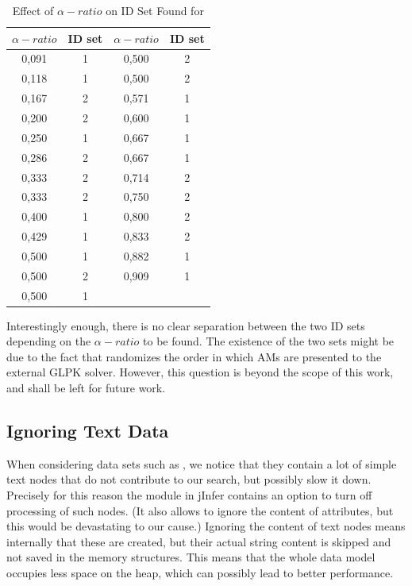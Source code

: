 \begin{table}
  \caption{Effect of $\alpha-ratio$ on ID Set Found for }
  \bigskip
  \label{table-experiments-various-betas-ova1-ratio-effect}
  \centering
  \begin{tabular}{c | c || c |  c}
    $\alpha-ratio$ & ID set & $\alpha-ratio$ & ID set \\
    \hline
    0,091	& 1 & 0,500	& 2 \\
    0,118	& 1 & 0,500	& 2 \\
    0,167	& 2 & 0,571	& 1 \\
    0,200	& 2 & 0,600	& 1 \\
    0,250	& 1 & 0,667	& 1 \\
    0,286	& 2 & 0,667	& 1 \\
    0,333	& 2 & 0,714	& 2 \\
    0,333	& 2 & 0,750	& 2 \\
    0,400	& 1 & 0,800	& 2 \\
    0,429	& 1 & 0,833	& 2 \\
    0,500	& 1 & 0,882	& 1 \\
    0,500	& 2 & 0,909	& 1 \\
    0,500	& 1 &       &   \\
  \end{tabular}
\end{table}

Interestingly enough, there is no clear separation between the two ID sets depending on the $\alpha-ratio$ to be found. The existence of the two sets might be due to the fact that  randomizes the order in which AMs are presented to the external GLPK solver. However, this question is beyond the scope of this work, and shall be left for future work.

\subsection{Ignoring Text Data}


When considering data sets such as , we notice that they contain a lot of simple text nodes that do not contribute to our search, but possibly slow it down. Precisely for this reason the  module in jInfer contains an option to turn off processing of such nodes. (It also allows to ignore the content of attributes, but this would be devastating to our cause.) Ignoring the content of text nodes means internally that these are created, but their actual string content is skipped and not saved in the memory structures. This means that the whole data model occupies less space on the heap, which can possibly lead to better performance.

